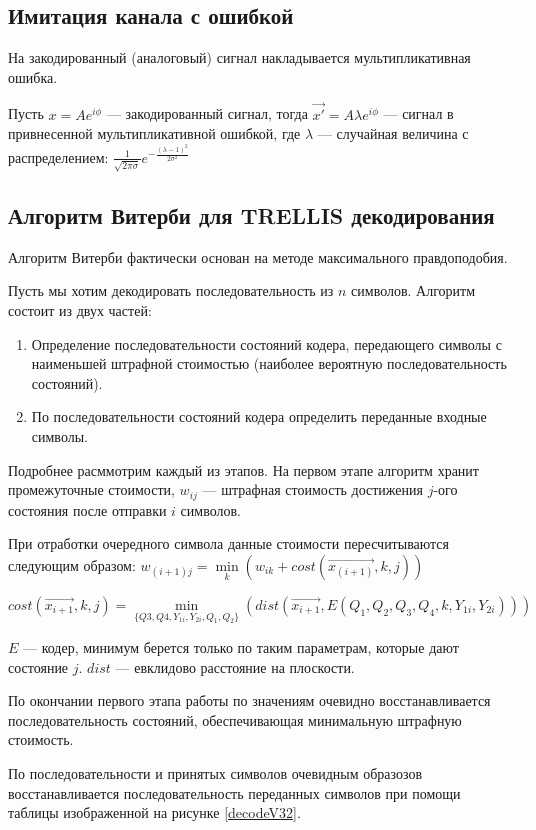 \documentclass[a4paper,12pt]{article}
\begin{document}
\subsection{Имитация канала с ошибкой}
На закодированный (аналоговый) сигнал накладывается мультипликативная ошибка. 

Пусть $x = A e^{i\phi}$ --- закодированный сигнал, тогда $\vec{x'} = A\lambda e^{i\phi}$ --- сигнал в привнесенной
мультипликативной ошибкой, где $\lambda$ --- случайная величина с распределением: 
$\frac{1}{\sqrt{2\pi\sigma}}e^{-\frac{(\lambda - 1)^2}{2\sigma^2}}$

\subsection{Алгоритм Витерби для TRELLIS декодирования}
Алгоритм Витерби фактически основан на методе максимального правдоподобия.

Пусть мы хотим декодировать последовательность из $n$ символов. Алгоритм состоит из двух частей:
\begin{enumerate}
	\item Определение последовательности состояний кодера, передающего символы с наименьшей штрафной стоимостью
		(наиболее вероятную последовательность состояний).
	\item По последовательности состояний кодера определить переданные входные символы.
\end{enumerate}

Подробнее расммотрим каждый из этапов. На первом этапе алгоритм хранит промежуточные стоимости, $w_{ij}$ --- штрафная
стоимость достижения $j$-ого состояния после отправки $i$ символов.

При отработки очередного символа данные стоимости пересчитываются следующим образом:
$w_{(i + 1)j} = \min\limits_{k}(w_{ik} + cost(\vec{x_(i + 1)}, k, j))$

$cost(\vec{x_{i + 1}}, k, j) = \min\limits_{\{Q3, Q4, Y_{1i}, Y_{2i}, Q_1, Q_2\}}
(dist(\vec{x_{i + 1}}, E(Q_1, Q_2, Q_3, Q_4, k, Y_{1i}, Y_{2i})))$

$E$ --- кодер, минимум берется только по таким параметрам, которые дают состояние $j$. $dist$ --- евклидово расстояние
на плоскости.

По окончании первого этапа работы по значениям очевидно восстанавливается последовательность состояний, обеспечивающая
минимальную штрафную стоимость.

По последовательности и принятых символов очевидным образозов восстанавливается последовательность переданных символов
при помощи таблицы изображенной на рисунке \ref{decodeV32}.
\end{document}
